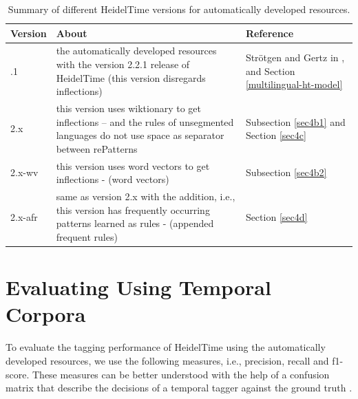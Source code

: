 \begin{table}[H]
	\centering
	\begin{threeparttable}
		\begin{tabularx}{\linewidth}{||>{\raggedright\arraybackslash}p{.7in} | >{\raggedright\arraybackslash}X |  >{\raggedright\arraybackslash}p{1.2in}||} 
			\hline
			\textbf{Version} & \textbf{About} & \textbf{Reference} \\ [0.5ex] 
			\hline\hline
			2.2.1 & the automatically developed resources with the version 2.2.1 release of HeidelTime (this version disregards inflections)  & Str\"otgen and Gertz in \cite{DBLP:conf/emnlp/StrotgenG15}, and Section \ref{multilingual-ht-model} \\ 
			\hline
			2.x & this version uses wiktionary to get inflections -- and the rules of unsegmented languages do not use space as separator between rePatterns & Subsection \ref{sec4b1} and Section \ref{sec4c} \\ 
			\hline
			2.x-wv & this version uses word vectors to get inflections - (word vectors)& Subsection \ref{sec4b2} \\ 
			\hline
			2.x-afr & same as version 2.x with the addition, i.e., this version has frequently occurring patterns learned as rules - (appended frequent rules) & Section \ref{sec4d} \\ 
			\hline
		\end{tabularx}
	\end{threeparttable}
	\caption{Summary of different HeidelTime versions for automatically developed resources.}
	\label{table:5a}
\end{table}

\section{Evaluating Using Temporal Corpora}
To evaluate the tagging performance of HeidelTime using the automatically developed resources, we use the following measures, i.e., precision, recall and f1-score. These measures can be better understood with the help of a confusion matrix that describe the decisions of a temporal tagger against the ground truth \cite{DBLP:series/synthesis/2016Strotgen}.

